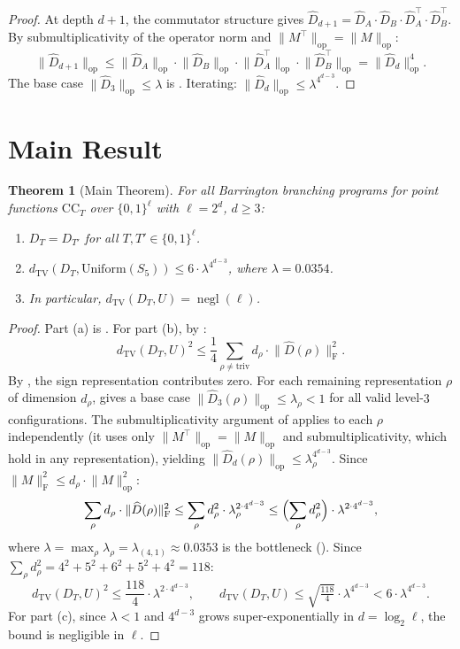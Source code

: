 \documentclass[11pt]{article}
\newtheorem{theorem}{Theorem}[section]
\DeclareMathOperator{\negl}{negl}
\newcommand{\norm}[1]{\lVert #1 \rVert}
\newcommand{\frob}[1]{\norm{#1}_{\mathrm{F}}}
\newcommand{\opn}[1]{\norm{#1}_{\mathrm{op}}}
\newcommand{\dtv}{d_{\mathrm{TV}}}
\newcommand{\Dhat}{\widehat{D}}
\newcommand{\CC}{\mathrm{CC}}
\begin{document}
\begin{proof}
At depth $d+1$, the commutator structure gives
$\Dhat_{d+1} = \Dhat_A \cdot \Dhat_B \cdot \Dhat_A^\top \cdot \Dhat_B^\top$.
By submultiplicativity of the operator norm and $\opn{M^\top} = \opn{M}$:
\[
\opn{\Dhat_{d+1}} \leq \opn{\Dhat_A} \cdot \opn{\Dhat_B} \cdot
\opn{\Dhat_A^\top} \cdot \opn{\Dhat_B^\top} = \opn{\Dhat_d}^4.
\]
The base case $\opn{\Dhat_3} \leq \lambda$ is .
Iterating: $\opn{\Dhat_d} \leq \lambda^{4^{d-3}}$.
\end{proof}


\section{Main Result}
\label{sec:main}

\begin{theorem}[Main Theorem]
\label{thm:main}
For all Barrington branching programs for point functions $\CC_T$ over
$\{0,1\}^\ell$ with $\ell = 2^d$, $d \geq 3$:
\begin{enumerate}[label=(\alph*),nosep]
\item $D_T = D_{T'}$ for all $T, T' \in \{0,1\}^\ell$.
\item $\dtv(D_T, \mathrm{Uniform}(S_5)) \leq 6 \cdot \lambda^{4^{d-3}}$,
  where $\lambda = 0.0354$.
\item In particular, $\dtv(D_T, U) = \negl(\ell)$.
\end{enumerate}
\end{theorem}

\begin{proof}
Part (a) is . For part (b), by :
\[
\dtv(D_T, U)^2 \leq \frac{1}{4} \sum_{\rho \neq \mathrm{triv}} d_\rho \cdot
\frob{\Dhat(\rho)}^2.
\]
By , the sign representation contributes zero.
For each remaining representation $\rho$ of dimension $d_\rho$,
 gives a base case
$\opn{\Dhat_3(\rho)} \leq \lambda_\rho < 1$ for all valid level-$3$
configurations. The submultiplicativity argument of 
applies to each $\rho$ independently (it uses only $\opn{M^\top} = \opn{M}$
and submultiplicativity, which hold in any representation), yielding
$\opn{\Dhat_d(\rho)} \leq \lambda_\rho^{4^{d-3}}$.
Since $\frob{M}^2 \leq d_\rho \cdot \opn{M}^2$:
\[
\sum_{\rho} d_\rho \cdot \frob{\Dhat(\rho)}^2
\leq \sum_{\rho} d_\rho^2 \cdot \lambda_\rho^{2 \cdot 4^{d-3}}
\leq \Bigl(\sum_{\rho} d_\rho^2\Bigr) \cdot \lambda^{2 \cdot 4^{d-3}},
\]
where $\lambda = \max_\rho \lambda_\rho = \lambda_{(4,1)} \approx 0.0353$
is the bottleneck (). Since
$\sum_\rho d_\rho^2 = 4^2 + 5^2 + 6^2 + 5^2 + 4^2 = 118$:
\[
\dtv(D_T, U)^2 \leq \frac{118}{4} \cdot \lambda^{2 \cdot 4^{d-3}},
\qquad
\dtv(D_T, U) \leq \sqrt{\tfrac{118}{4}} \cdot \lambda^{4^{d-3}}
< 6 \cdot \lambda^{4^{d-3}}.
\]
For part (c), since $\lambda < 1$ and $4^{d-3}$ grows super-exponentially in
$d = \log_2 \ell$, the bound is negligible in $\ell$.
\end{proof}
\end{document}
